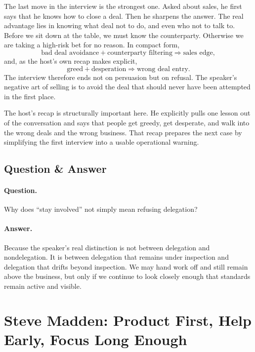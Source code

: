 The last move in the interview is the strongest one. Asked about sales, he first says that he knows how to close a deal. Then he sharpens the answer. The real advantage lies in knowing what deal not to do, and even who not to talk to. Before we sit down at the table, we must know the counterparty. Otherwise we are taking a high-risk bet for no reason. In compact form,
\begin{equation}
\text{bad deal avoidance} + \text{counterparty filtering} \Rightarrow \text{sales edge},
\end{equation}
and, as the host's own recap makes explicit,
\begin{equation}
\text{greed} + \text{desperation} \Rightarrow \text{wrong deal entry}.
\end{equation}
The interview therefore ends not on persuasion but on refusal. The speaker's negative art of selling is to avoid the deal that should never have been attempted in the first place.

The host's recap is structurally important here. He explicitly pulls one lesson out of the conversation and says that people get greedy, get desperate, and walk into the wrong deals and the wrong business. That recap prepares the next case by simplifying the first interview into a usable operational warning.

\subsection{Question \& Answer}

\paragraph{Question.} Why does ``stay involved'' not simply mean refusing delegation?

\paragraph{Answer.} Because the speaker's real distinction is not between delegation and nondelegation. It is between delegation that remains under inspection and delegation that drifts beyond inspection. We may hand work off and still remain above the business, but only if we continue to look closely enough that standards remain active and visible.

\section{Steve Madden: Product First, Help Early, Focus Long Enough}

